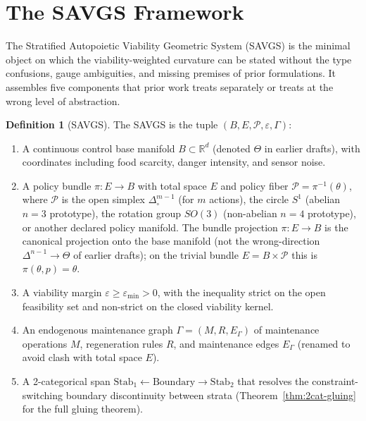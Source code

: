 \documentclass[11pt,a4paper]{article}
\theoremstyle{plain}
\theoremstyle{definition}
\newtheorem{definition}[theorem]{Definition}
\theoremstyle{remark}
\newcommand{\RR}{\mathbb{R}}
\newcommand{\Stab}{\mathrm{Stab}}
\begin{document}

\section{The SAVGS Framework}\label{sec:savgs}

The Stratified Autopoietic Viability Geometric System (SAVGS) is the
minimal object on which the viability-weighted curvature can be stated
without the type confusions, gauge ambiguities, and missing premises of
prior formulations. It assembles five components that prior work treats
separately or treats at the wrong level of abstraction.

\begin{definition}[SAVGS]
\label{def:savgs}
The SAVGS is the tuple $(B, E, \mathcal P, \varepsilon, \Gamma)$:
\begin{enumerate}[leftmargin=*,itemsep=2pt]
\item A continuous control base manifold $B \subset \RR^d$ (denoted
$\Theta$ in earlier drafts), with coordinates including food
scarcity, danger intensity, and sensor noise.
\item A policy bundle $\pi : E \to B$ with total space $E$ and policy
fiber $\mathcal P = \pi^{-1}(\theta)$, where $\mathcal P$ is the open
simplex $\Delta^{m-1}_\circ$ (for $m$ actions), the circle $S^1$
(abelian $n=3$ prototype), the rotation group $SO(3)$ (non-abelian
$n=4$ prototype), or another declared policy manifold. The bundle
projection $\pi : E \to B$ is the canonical projection onto the base
manifold (not the wrong-direction $\Delta^{n-1} \to \Theta$ of earlier
drafts); on the trivial bundle $E = B \times \mathcal P$ this is
$\pi(\theta, p) = \theta$.
\item A viability margin $\varepsilon\geq\varepsilon_{\min}>0$, with
the inequality strict on the open feasibility set and non-strict on the
closed viability kernel.
\item An endogenous maintenance graph $\Gamma=(M, R, E_\Gamma)$ of
maintenance operations $M$, regeneration rules $R$, and maintenance
edges $E_\Gamma$ (renamed to avoid clash with total space $E$).
\item A 2-categorical span $\Stab_1\leftarrow\mathrm{Boundary}\rightarrow
\Stab_2$ that resolves the constraint-switching boundary discontinuity
between strata (Theorem~\ref{thm:2cat-gluing} for
the full gluing theorem).
\end{enumerate}
\end{definition}
\end{document}
